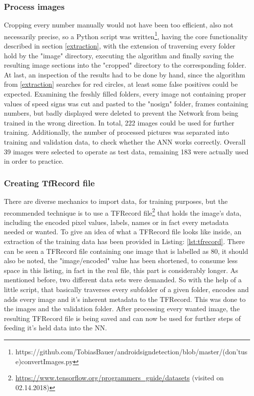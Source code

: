 \subsubsection{Process images}
Cropping every number manually would not have been too efficient, also not necessarily precise, so a Python script was written\footnote{https://github.com/TobiasBauer/androidsigndetection/blob/master/(don'tuse)convertImages.py}, having the core functionality described in section \ref{extraction}, with the extension of traversing every folder hold by the "image" directory, executing the algorithm and finally saving the resulting image sections into the "cropped" directory to the corresponding folder. At last, an inspection of the results had to be done by hand, since the algorithm from \ref{extraction} searches for red circles, at least some false positives could be expected. Examining the freshly filled folders, every image not containing proper values of speed signs was cut and pasted to the "nosign" folder, frames containing numbers, but badly displayed were deleted to prevent the Network from being trained in the wrong direction. In total, 222 images could be used for further training. Additionally, the number of processed pictures was separated into training and validation data, to check whether the ANN works correctly. Overall 39 images were selected to operate as test data, remaining 183 were actually used in order to practice. 

\subsubsection{Creating TfRecord file}
There are diverse mechanics to import data, for training purposes, but the recommended technique is to use a TFRecord file\footnote{\url{https://www.tensorflow.org/programmers\_guide/datasets} (visited on 02.14.2018)} that holds the image's data, including the encoded pixel values, labels, names or in fact every metadata needed or wanted. To give an idea of what a TFRecord file looks like inside, an extraction of the training data has been provided in Listing: \ref{lst:tfrecord}. There can be seen a TFRecord file containing one image that is labelled as 80, it should also be noted, the "image/encoded" value has been shortened, to consume less space in this listing, in fact in the real file, this part is considerably longer.\newline 
As mentioned before, two different data sets were demanded. So with the help of a little script, that basically traverses every subfolder of a given folder, encodes and adds every image and it's inherent metadata to the TFRecord. This was done to the images and the validation folder. After processing every wanted image, the resulting TFRecord file is being saved and can now be used for further steps of feeding it's held data into the NN. 


